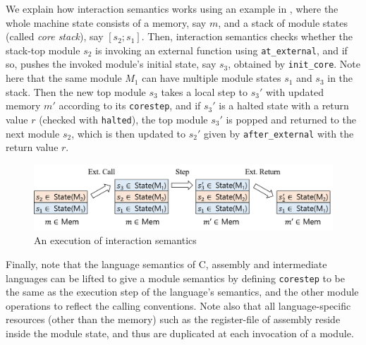 We explain how interaction semantics works using an example in
, where the whole machine state consists of a
memory, say $m$, and a stack of module states (called \emph{core stack}), say $[s_2; s_1]$.
Then, interaction semantics checks whether the stack-top module $s_2$
is invoking an external function using \texttt{at\_external}, and if
so, pushes the invoked module's initial state, say $s_3$, obtained by
\texttt{init\_core}. Note here that the same module $M_1$ can have
multiple module states $s_1$ and $s_3$ in the stack.  Then the
new top module $s_3$ takes a local step to $s_3'$ with updated memory
$m'$ according to its \texttt{corestep}, and if $s_3'$ is a halted
state with a return value $r$ (checked with \texttt{halted}), the top
module $s_3'$ is popped and returned to the next module $s_2$, which
is then updated to $s_2'$ given by \texttt{after\_external} with the return
value $r$.

\begin{figure}[t]
\includegraphics[width=0.9\linewidth]{images/intersem.png}
\caption{An execution of interaction semantics}
\label{fig:inter-sem}
\end{figure}


Finally, note that the language semantics of C, assembly and
intermediate languages can be lifted to give a module semantics by
defining \texttt{corestep} to be the same as the execution step of the
language's semantics, and the other module operations to reflect the
calling conventions. Note also that all language-specific resources
(\ie other than the memory)
such as the register-file of assembly 
reside inside the module state, and thus are
duplicated at each invocation of a module.

